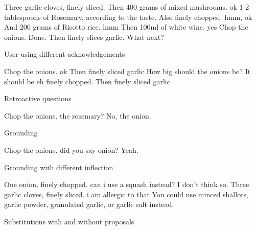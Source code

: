 \documentclass[
	11pt, %
]{fphw}
\newenvironment{captionedDialogue}
    {\captionsetup{
        type=Dialogue,
        skip=2pt,
        belowskip=13pt
        }
    }
    {}
\newenvironment{mydialogue}
    {\begin{snugshade}
     \hrulefill
     \begin{dialogue}}
    {\end{dialogue}
     \hrulefill
     \end{snugshade}}
\begin{document}
\begin{captionedDialogue}
    \begin{mydialogue}
         Three garlic cloves, finely sliced.
         Then 400 grams of mixed mushrooms.
         ok
         1-2 tablespoons of Rosemary, according to the taste. Also finely chopped.
         hmm, ok
         And 200 grams of Risotto rice.
         hmm
         Then 100ml of white wine.
         yes
         Chop the onions.
         Done.
         Then finely slices garlic.
         What next?
    \end{mydialogue}
    \caption{User using different acknowledgements}
    \label{dia:different_acks}
\end{captionedDialogue}

\begin{captionedDialogue}
    \begin{mydialogue}
         Chop the onions.
         ok
         Then finely sliced garlic
         How big should the onions be?
         It should be eh finely chopped.
         Then finely sliced garlic
    \end{mydialogue}
    \caption{Retroactive questions}
    \label{dia:retroactive_questions}
\end{captionedDialogue}

\begin{captionedDialogue}
    \begin{mydialogue}
         Chop the onions.
         the rosemary?
         No, the onion.
    \end{mydialogue}
    \caption{Grounding}
    \label{dia:grounding}
\end{captionedDialogue}

\begin{captionedDialogue}
    \begin{mydialogue}
         Chop the onions.
         did you say onion?
         Yeah.
    \end{mydialogue}
    \caption{Grounding with different inflection}
    \label{dia:grounding_inflection}
\end{captionedDialogue}

\begin{captionedDialogue}
    \begin{mydialogue}
         One onion, finely chopped.
         can i use a squash instead?
         I don't think so.
         Three garlic cloves, finely sliced.
         i am allergic to that
         You could use minced shallots, garlic powder, granulated garlic, or garlic salt instead.
    \end{mydialogue}
    \caption{Substitutions with and without proposals}
    \label{dia:substitutions}
\end{captionedDialogue}
\end{document}
